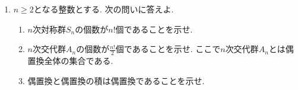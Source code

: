 \documentclass[dvipdfmx,a4paper,11pt]{article} %
\theoremstyle{definition}
\begin{document}
\begin{enumerate}[label=\textbf{問題}\arabic*.]
$$\begin{pmatrix}
2& 1& 3& 4& 5 \\
\end{pmatrix}
=(1,2)
\quad
\begin{pmatrix}
1& 2& 3 & 4  & 5 \\
1& 2& 4& 3& 5 \\
\end{pmatrix}
=(3,4)
\quad
\begin{pmatrix}
1& 2& 3 & 4  & 5 \\
4& 2& 3& 1& 5 \\
\end{pmatrix}
=(1,4)
$$
は全て互換である.  次の問いに答えよ.
\begin{enumerate}
\item (定理3.1.9) 互換の符号を求めよ.
\item (定理3.1.11) $r$個の互換の積で表される置換の符号を求めよ. 
\end{enumerate}


\item $n \ge 2$となる整数とする. 次の問いに答えよ.
\begin{enumerate}
\item $n$次対称群$S_n$の個数が$n!$個であることを示せ.
\item $n$次交代群$A_n$の個数が$\frac{n!}{2}$個であることを示せ. ここで$n$次交代群$A_n$とは偶置換全体の集合である. 
\item 偶置換と偶置換の積は偶置換であることを示せ. 
\end{enumerate}

\end{enumerate}
\newpage
\end{document}
